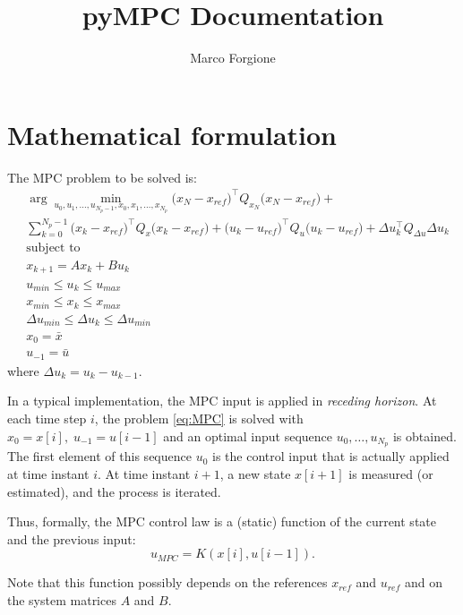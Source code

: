 \documentclass[a4paper,12pt,fleqn]{article}
\newcommand{\QxN}{Q_{x_N}}
\newcommand{\Qx}{Q_{x}}
\newcommand{\Qu}{Q_{u}}
\newcommand{\Qdu}{Q_{\Delta u}}
\newcommand{\Np}{N_p}
\begin{document}
 \title{pyMPC Documentation}
\author{Marco Forgione}

\maketitle


\section{Mathematical formulation}

The MPC problem to be solved is:
\begin{subequations}
\label{eq:MPC}
\begin{align}
  &\arg \min_{u_0,u_1,\dots,u_{\Np-1}, x_0, x_1,\dots,x_{\Np}} \big(x_N - x_{ref}\big)^\top \QxN \big(x_N - x_{ref}\big) + \nonumber \\  
  &\sum_{k=0}^{\Np-1} \big(x_k - x_{ref}\big)^\top \Qx\big(x_k - x_{ref}\big) + \big(u_k - u_{ref}\big)^\top \Qu \big(u_k - u_{ref}\big)  +  
  \Delta u_k^\top \Qdu \Delta u_k \\ \nonumber
  &\text{subject to} \nonumber\\
  &x_{k+1} = Ax_k + B u_k\\ 
  &u_{min} \leq u_k \leq u_{max}\\
  &x_{min} \leq x_k \leq x_{max}\\
  &\Delta u_{min} \leq \Delta u_k \leq \Delta u_{min}\\
  &x_0 = \bar x\\
  &u_{-1} = \bar u
\end{align}
\end{subequations}
where $\Delta u_k = u_k - u_{k-1}$.

In a typical implementation, the MPC input is applied in \emph{receding horizon}. At each time step $i$, the problem \eqref{eq:MPC} is solved with $x_0=x[i],\;u_{-1}=u[{i-1}]$ and an optimal input sequence $u_{0},\dots,u_{\Np}$ is obtained. The first element of this sequence $u_0$ is the control input that is actually applied at time instant $i$. At time instant $i+1$, a new state $x[i+1]$ is measured (or estimated), and the process is iterated. 

Thus, formally, the MPC control law is a (static) function of the current state and the previous input:
\begin{equation}
 u_{MPC} = K(x[i], u[i-1]).
\end{equation}

Note that this function possibly depends on the references $x_{ref}$ and $u_{ref}$ and on the system matrices $A$ and $B$.
\end{document}
